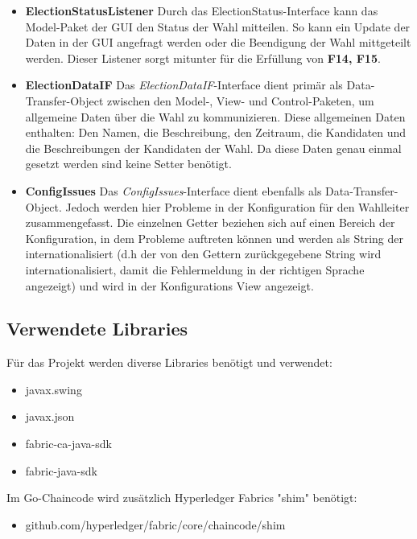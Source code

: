 \documentclass[parskip=full]{scrartcl}
\newcommand{\fakeparagraph}[1]{\textbf{#1}}
\begin{document}
\begin{itemize}
	\item\fakeparagraph{ElectionStatusListener} Durch das ElectionStatus-Interface kann das Model-Paket der GUI den Status der Wahl mitteilen. So kann ein Update der Daten in der GUI angefragt werden oder die Beendigung der Wahl mittgeteilt werden.
	Dieser Listener sorgt mitunter für die Erfüllung von \textbf{F14, F15}.

	\item\fakeparagraph{ElectionDataIF} Das \textit{ElectionDataIF}-Interface dient primär als Data-Transfer-Object zwischen den Model-, View- und Control-Paketen, um allgemeine Daten über die Wahl zu kommunizieren. Diese allgemeinen Daten enthalten: Den Namen, die Beschreibung, den Zeitraum, die Kandidaten und die Beschreibungen der Kandidaten der Wahl. Da diese Daten genau einmal gesetzt werden sind keine Setter benötigt.

	\item\fakeparagraph{ConfigIssues} Das \textit{ConfigIssues}-Interface dient ebenfalls als Data-Transfer-Object. Jedoch werden hier Probleme in der Konfiguration für den Wahlleiter zusammengefasst. Die einzelnen Getter beziehen sich auf einen Bereich der Konfiguration, in dem Probleme auftreten können und werden als String der internationalisiert (d.h der von den Gettern zurückgegebene String wird internationalisiert, damit die Fehlermeldung in der richtigen Sprache angezeigt) und wird in der Konfigurations View angezeigt.

	\end{itemize}

	\subsection{Verwendete Libraries}
	Für das Projekt werden diverse Libraries benötigt und verwendet:
	\begin{itemize}
		\item javax.swing
		\item javax.json
		\item fabric-ca-java-sdk
		\item fabric-java-sdk
	\end{itemize}
	Im Go-Chaincode wird zusätzlich Hyperledger Fabrics "shim" benötigt:
	\begin{itemize}
	\item github.com/hyperledger/fabric/core/chaincode/shim
	\end{itemize}
\end{document}
